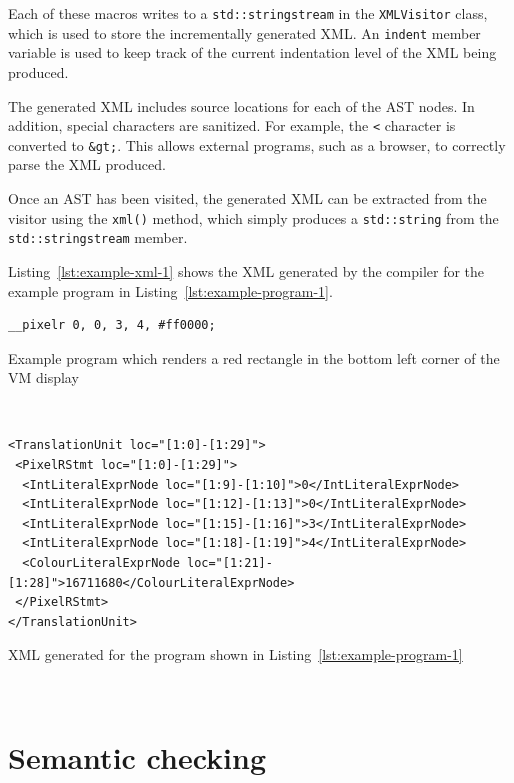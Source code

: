 \documentclass[11pt,a4paper]{scrartcl}
\begin{document}
Each of these macros writes to a \verb!std::stringstream! in the \verb!XMLVisitor! class, which is used to store the incrementally generated XML. An \verb!indent! member variable is used to keep track of the current indentation level of the XML being produced.

The generated XML includes source locations for each of the AST nodes. In addition, special characters are sanitized. For example, the \verb!<! character is converted to \verb!&gt;!. This allows external programs, such as a browser, to correctly parse the XML produced.

Once an AST has been visited, the generated XML can be extracted from the visitor using the \verb!xml()! method, which simply produces a \verb!std::string! from the \verb!std::stringstream! member.

Listing~\ref{lst:example-xml-1} shows the XML generated by the compiler for the example program in Listing~\ref{lst:example-program-1}.

\begin{lstfloat}

\begin{verbatim}
__pixelr 0, 0, 3, 4, #ff0000;
\end{verbatim}
  \caption{Example program which renders a red rectangle in the bottom left corner of the VM display}~\label{lst:example-program-1}
\end{lstfloat}

\begin{lstfloat}

\begin{verbatim}
<TranslationUnit loc="[1:0]-[1:29]">
 <PixelRStmt loc="[1:0]-[1:29]">
  <IntLiteralExprNode loc="[1:9]-[1:10]">0</IntLiteralExprNode>
  <IntLiteralExprNode loc="[1:12]-[1:13]">0</IntLiteralExprNode>
  <IntLiteralExprNode loc="[1:15]-[1:16]">3</IntLiteralExprNode>
  <IntLiteralExprNode loc="[1:18]-[1:19]">4</IntLiteralExprNode>
  <ColourLiteralExprNode loc="[1:21]-[1:28]">16711680</ColourLiteralExprNode>
 </PixelRStmt>
</TranslationUnit>
\end{verbatim}
  \caption{XML generated for the program shown in Listing~\ref{lst:example-program-1}}~\label{lst:example-xml-1}

\end{lstfloat}

\newpage

\section{Semantic checking}
\end{document}
